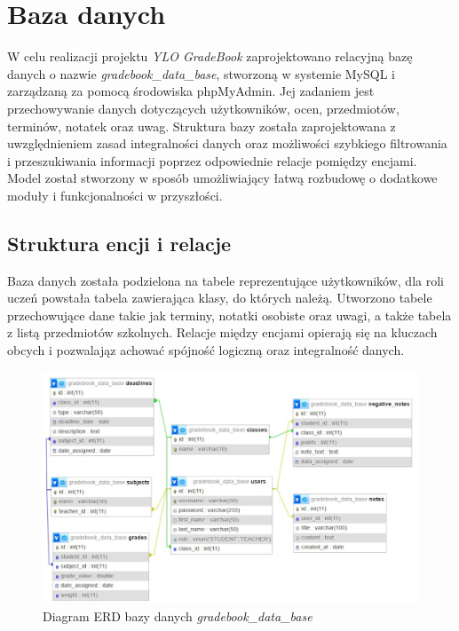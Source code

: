 \newpage
\section{Baza danych}
W celu realizacji projektu \textit{YLO GradeBook} zaprojektowano relacyjną bazę danych o nazwie \textit{gradebook\_data\_base}, stworzoną w systemie MySQL i zarządzaną za pomocą środowiska phpMyAdmin. Jej zadaniem jest przechowywanie danych dotyczących użytkowników, ocen, przedmiotów, terminów, notatek oraz uwag. Struktura bazy została zaprojektowana z uwzględnieniem zasad integralności danych oraz możliwości szybkiego filtrowania i przeszukiwania informacji poprzez odpowiednie relacje pomiędzy encjami. Model został stworzony w sposób umożliwiający łatwą rozbudowę o dodatkowe moduły i funkcjonalności w przyszłości.

\subsection{Struktura encji i relacje}
Baza danych została podzielona na tabele reprezentujące użytkowników, dla roli uczeń powstała tabela zawierająca klasy, do których należą. Utworzono tabele przechowujące dane takie jak terminy, notatki osobiste oraz uwagi, a także tabela z listą przedmiotów szkolnych. Relacje między encjami opierają się na kluczach obcych i pozwalająz achować spójność logiczną oraz integralność danych.

\begin{figure}[H]
    \centering
    \includegraphics[width=1\textwidth]{figures/fig_0002.eps}
    \caption{Diagram ERD bazy danych \textit{gradebook\_data\_base}}
    \label{fig:erd}
\end{figure}
\newpage
